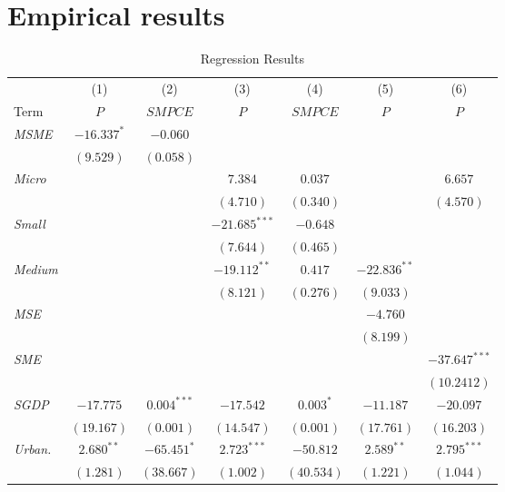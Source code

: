 \documentclass [12pt]{article}
\begin{document}
\section{Empirical results}
\begin{table}[htbp]
    \centering
    \smaller
    \caption{Regression Results}
\begin{tabular}{lcccccc}
    \toprule
    \toprule
     & (1) & (2) & (3) & (4) & (5) & (6) \\
    Term & \(P\) & \(SMPCE\) & \(P\) & \(SMPCE\) & \(P\) & \(P\) \\
    \midrule
    \textit{MSME} & $-16.337^{*}$ & $-0.060$ & & & & \\
                  & $(9.529)$ & $(0.058)$ & & & & \\
                   
    \textit{Micro} & & & $7.384$ & $0.037$ & & $6.657$ \\
                   & & & $(4.710)$ & $(0.340)$ & & $(4.570)$ \\
                   
    \textit{Small} & & & $-21.685^{***}$ & $-0.648$ & & \\
                   & & & $(7.644)$ & $(0.465)$ & & \\
                   
    \textit{Medium} & & & $-19.112^{**}$ & $0.417$ & $-22.836^{**}$ & \\
                    & & & $(8.121)$ & $(0.276)$ & $(9.033)$ & \\
                    
    \textit{MSE} & & & & & $-4.760$ &  \\
                 & & & & & $(8.199)$ &  \\
                 
    \textit{SME} & & & & & & $-37.647^{***}$ \\
                 & & & & & & $(10.2412)$\\
                      
    \textit{SGDP} & $-17.775$ & $0.004^{***}$ & $-17.542$ & $0.003^{*}$ & $-11.187$ & $-20.097$ \\
                  & $(19.167)$ & $(0.001)$ & $(14.547)$ & $(0.001)$ & $(17.761)$ & $(16.203)$ \\
                  
    \textit{Urban.} & $2.680^{**}$ & $-65.451^{*}$ & $2.723^{***}$ & $-50.812$ & $2.589^{**}$ & $2.795^{***}$ \\
                   & $(1.281)$ & $(38.667)$ & $(1.002)$ & $(40.534)$ & $(1.221)$ & $(1.044)$ \\
                   

\end{tabular}
\end{table}
\end{document}
